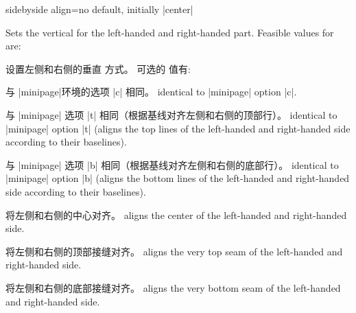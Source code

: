 \begin{docTcbKey}[][doc updated=2015-02-06]{sidebyside align}{=}{no default, initially |center|}

Sets the vertical  for the left-handed and right-handed part.%
Feasible values for  are:

设置左侧和右侧的垂直  方式。%
可选的  值有:

\begin{tcolorbox}[title=\docValue{center},sidebyside,sidebyside align=center]
与 |minipage|环境的选项 |c| 相同。
\tcblower
identical to |minipage| option |c|.
\end{tcolorbox}
 
\begin{tcolorbox}[title=\docValue{top},sidebyside,sidebyside align=top]
与 |minipage| 选项 |t| 相同（根据基线对齐左侧和右侧的顶部行）。
\tcblower
identical to |minipage| option |t| (aligns the top lines of the left-handed and right-handed side according to their baselines).
\end{tcolorbox}

\begin{tcolorbox}[title=\docValue{bottom},sidebyside,sidebyside align=bottom]
与 |minipage| 选项 |b| 相同（根据基线对齐左侧和右侧的底部行）。
\tcblower
identical to |minipage| option |b| (aligns the bottom lines of the left-handed and right-handed side according to their baselines).
\end{tcolorbox}


\begin{tcolorbox}[title=\docValue{center seam},sidebyside,sidebyside align=center seam]
将左侧和右侧的中心对齐。
\tcblower
aligns the center of the left-handed and right-handed side.
\end{tcolorbox}

\begin{tcolorbox}[title=\docValue{top seam},sidebyside,sidebyside align=top seam]
将左侧和右侧的顶部接缝对齐。
\tcblower
aligns the very top seam of the left-handed and right-handed side.
\end{tcolorbox}


\begin{tcolorbox}[title=\docValue{bottom seam},sidebyside,sidebyside align=bottom seam]
将左侧和右侧的底部接缝对齐。
\tcblower
aligns the very bottom seam of the left-handed and right-handed side.
\end{tcolorbox}




\end{docTcbKey}
